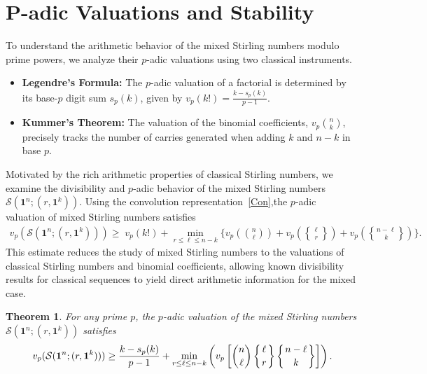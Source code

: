 \documentclass[12pt]{amsart}
\newtheorem{theorem}{Theorem}[section]
\theoremstyle{definition}
\begin{document}
\section{P-adic Valuations and Stability}
To understand the arithmetic behavior of the mixed Stirling numbers modulo prime powers, we analyze their $p$-adic valuations using two classical instruments.
\begin{itemize}
    \item \textbf{Legendre's Formula:} The $p$-adic valuation of a factorial is determined by its base-$p$ digit sum $s_p(k)$, given by $v_p(k!) = \frac{k - s_p(k)}{p-1}.$
    \item \textbf{Kummer's Theorem:} The valuation of the binomial coefficients, $v_p\binom{n}{k}$, precisely tracks the number of carries generated when adding $k$ and $n-k$ in base $p$. 
\end{itemize}
Motivated by the rich arithmetic properties of classical Stirling numbers, we examine the divisibility and $p$-adic behavior of the mixed Stirling numbers $\mathcal{S}(\mathbf{1}^n;(r,\mathbf{1}^k))$. 
Using the convolution representation~\eqref{Con},the $p$-adic valuation of mixed Stirling numbers satisfies
\begin{equation*}\label{equ1}
\begin{aligned}
v_p\!\left(\mathcal{S}(\mathbf{1}^n;(r,\mathbf{1}^k))\right)
\ge\;
v_p(k!)
+
\min_{r\le\ell\le n-k}
\Biggl\{
v_p\!\left(\binom{n}{\ell}\right)
+
v_p\!\left({\ell\brace r}\right)
+
v_p\!\left({n-\ell\brace k}\right)
\Biggr\}.
\end{aligned}
\end{equation*}
This estimate reduces the study of mixed Stirling numbers to the valuations of classical Stirling numbers and binomial coefficients, allowing known divisibility results for classical sequences to yield direct arithmetic information for the mixed case.
\begin{theorem}%
For any prime $p$, the $p$-adic valuation of the mixed Stirling numbers $\mathcal{S}(\mathbf{1}^n; (r, \mathbf{1}^k))$ satisfies
\begin{equation*}
    v_p(\mathcal{S}(\mathbf{1}^n; (r, \mathbf{1}^k))) \geq \frac{k - s_p(k)}{p-1} + \min_{r \le \ell \le n-k} \left( v_p\left[ \binom{n}{\ell} \left\{ \genfrac{}{}{0pt}{}{\ell}{r} \right\} \left\{ \genfrac{}{}{0pt}{}{n-\ell}{k} \right\} \right] \right).
\end{equation*}
\end{theorem}
\end{document}
